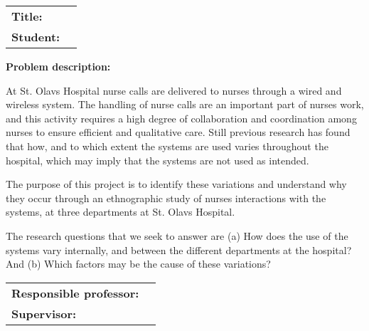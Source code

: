 \begin{titlingpage}

\noindent
\begin{tabular}{@{}p{4cm}l}
\textbf{Title:} 	& \thetitle \\
\textbf{Student:}	& \theauthor \\
\end{tabular}

\vspace{4ex}
\noindent\textbf{Problem description:}
\vspace{2ex}

\noindent
At St. Olavs Hospital nurse calls are delivered to nurses through a wired and wireless system. The handling of nurse calls are an important part of nurses work, and this activity requires a high degree of collaboration and coordination among nurses to ensure efficient and qualitative care.
Still previous research has found that how, and to which extent the systems are used varies throughout the hospital, which may imply that the systems are not used as intended.

\noindent
The purpose of this project is to identify these variations and understand why they occur through an ethnographic study of nurses interactions with the systems, at three departments at St. Olavs Hospital. 

\noindent
The research questions that we seek to answer are (a) How does the use of the systems vary internally, and between the different departments at the hospital? And (b) Which factors may be the cause of these variations?

\vspace{6ex}

\noindent
\begin{tabular}{@{}p{4cm}l}
\textbf{Responsible professor:} 	& \theprofessor \\
\textbf{Supervisor:}			& \thesupervisor \\
\end{tabular}

\end{titlingpage}